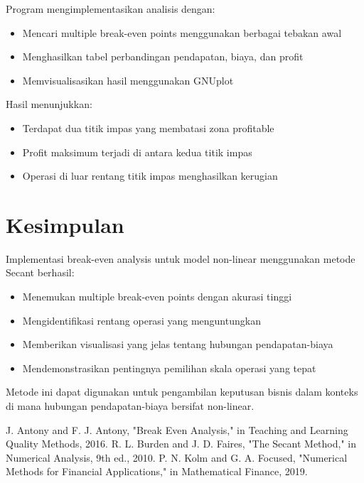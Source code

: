 \documentclass[conference]{IEEEtran}
\begin{document}
\endgroup
Program mengimplementasikan analisis dengan:
\begin{itemize}
\item Mencari multiple break-even points menggunakan berbagai tebakan awal
\item Menghasilkan tabel perbandingan pendapatan, biaya, dan profit
\item Memvisualisasikan hasil menggunakan GNUplot
\end{itemize}

Hasil menunjukkan:
\begin{itemize}
\item Terdapat dua titik impas yang membatasi zona profitable
\item Profit maksimum terjadi di antara kedua titik impas
\item Operasi di luar rentang titik impas menghasilkan kerugian
\end{itemize}

\section{Kesimpulan}
Implementasi break-even analysis untuk model non-linear menggunakan metode Secant berhasil:
\begin{itemize}
\item Menemukan multiple break-even points dengan akurasi tinggi
\item Mengidentifikasi rentang operasi yang menguntungkan
\item Memberikan visualisasi yang jelas tentang hubungan pendapatan-biaya
\item Mendemonstrasikan pentingnya pemilihan skala operasi yang tepat
\end{itemize}

Metode ini dapat digunakan untuk pengambilan keputusan bisnis dalam konteks di mana hubungan pendapatan-biaya bersifat non-linear.

\begin{thebibliography}{00}
 J. Antony and F. J. Antony, "Break Even Analysis," in Teaching and Learning Quality Methods, 2016.
 R. L. Burden and J. D. Faires, "The Secant Method," in Numerical Analysis, 9th ed., 2010.
 P. N. Kolm and G. A. Focused, "Numerical Methods for Financial Applications," in Mathematical Finance, 2019.
\end{thebibliography}
\end{document}
